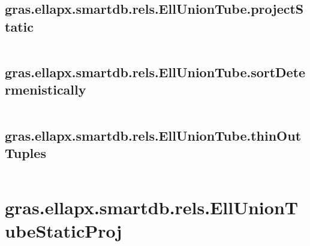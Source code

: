 \subsection{\texorpdfstring{gras.ellapx.smartdb.rels.EllUnionTube.projectStatic}{projectStatic}}\label{method:gras.ellapx.smartdb.rels.EllUnionTube.projectStatic}
\begin{verbatim}

\end{verbatim}
\subsection{\texorpdfstring{gras.ellapx.smartdb.rels.EllUnionTube.sortDetermenistically}{sortDetermenistically}}\label{method:gras.ellapx.smartdb.rels.EllUnionTube.sortDetermenistically}
\begin{verbatim}

\end{verbatim}
\subsection{\texorpdfstring{gras.ellapx.smartdb.rels.EllUnionTube.thinOutTuples}{thinOutTuples}}\label{method:gras.ellapx.smartdb.rels.EllUnionTube.thinOutTuples}
\begin{verbatim}

\end{verbatim}
\section{gras.ellapx.smartdb.rels.EllUnionTubeStaticProj}\label{secClassDescr:gras.ellapx.smartdb.rels.EllUnionTubeStaticProj}
